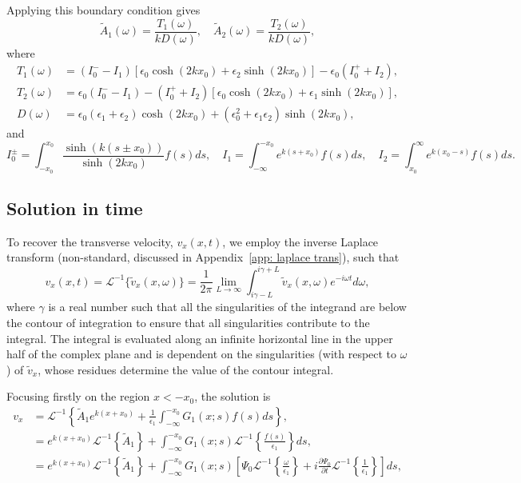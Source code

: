 \documentclass{aastex61}
\begin{document}
Applying this boundary condition gives
\begin{equation}
\tilde{A}_1(\omega) = \frac{T_1(\omega)}{k D(\omega)}, \quad \tilde{A}_2(\omega) = \frac{T_2(\omega)}{k D(\omega)},
\end{equation}
where
\begin{align}
T_1(\omega) & = (I_0^- - I_1)[\epsilon_0\cosh(2kx_0) + \epsilon_2\sinh(2kx_0)] - \epsilon_0(I_0^+ + I_2), \\
T_2(\omega) & = \epsilon_0(I_0^- - I_1) - (I_0^+ + I_2)[\epsilon_0\cosh(2kx_0) + \epsilon_1\sinh(2kx_0)], \\
D(\omega) & = \epsilon_0(\epsilon_1 + \epsilon_2)\cosh(2kx_0) + (\epsilon_0^2 + \epsilon_1\epsilon_2)\sinh(2kx_0),
\label{D incomp}
\end{align}
and
\begin{equation}
I_0^\pm = \int_{-x_0}^{x_0} \frac{\sinh(k(s \pm x_0))}{\sinh(2kx_0)} f(s) ds,
\quad
I_1 = \int_{-\infty}^{-x_0} e^{k(s + x_0)} f(s) ds,
\quad
I_2 = \int_{x_0}^\infty e^{k(x_0 - s)} f(s) ds.
\end{equation}


\subsection{Solution in time}

To recover the transverse velocity, $v_x(x, t)$, we employ the inverse Laplace transform (non-standard, discussed in Appendix~\ref{app: laplace trans}), such that
\begin{equation}
v_x(x,t) = \mathcal{L}^{-1}\{\tilde{v}_x(x, \omega)\} = \frac{1}{2\pi} \lim_{L \to \infty} \int_{i\gamma - L}^{i\gamma + L} \tilde{v}_x(x,\omega) e^{-i\omega t} d\omega,
\label{laplace transform}
\end{equation}
where $\gamma$ is a real number such that all the singularities of the integrand are below the contour of integration to ensure that all singularities contribute to the integral. The integral is evaluated along an infinite horizontal line in the upper half of the complex plane and is dependent on the singularities (with respect to $\omega$) of $\tilde{v}_x$, whose residues determine the value of the contour integral.

Focusing firstly on the region $x<-x_0$, the solution is
\newcommand{\e}{\epsilon}
\begin{align}
v_x &= \mathcal{L}^{-1} \left\{ \tilde{A}_1 e^{k(x+x_0)} + \frac{1}{\e_1} \int_{-\infty}^{-x_0} G_1(x;s)f(s)ds \right\}, \\
&= e^{k(x+x_0)} \mathcal{L}^{-1}\left\{ \tilde{A}_1 \right\} + \int_{-\infty}^{-x_0} G_1(x;s) \mathcal{L}^{-1}\left\{ \frac{f(s)}{\e_1} \right\} ds, \\
&= e^{k(x+x_0)} \mathcal{L}^{-1}\left\{ \tilde{A}_1 \right\} + \int_{-\infty}^{-x_0} G_1(x;s) \left[ \Psi_0 \mathcal{L}^{-1}\left\{ \frac{\omega}{\e_1} \right\} + i \frac{\partial \Psi_0}{\partial t} \mathcal{L}^{-1}\left\{ \frac{1}{\e_1} \right\}\right] ds,
\label{sol incomp}
\end{align}
\end{document}
